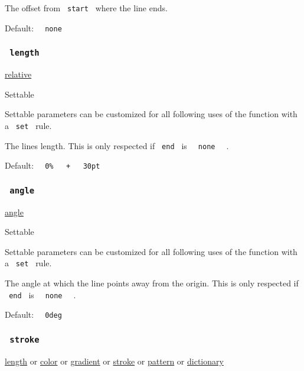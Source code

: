 The offset from \texttt{\ start\ } where the line ends.

Default: \texttt{\ }{\texttt{\ none\ }}\texttt{\ }

\subsubsection{\texorpdfstring{\texttt{\ length\ }}{ length }}\label{parameters-length}

\href{/docs/reference/layout/relative/}{relative}

{{ Settable }}

\label{parameters-length-settable-tooltip}
Settable parameters can be customized for all following uses of the
function with a \texttt{\ set\ } rule.

The line\textquotesingle s length. This is only respected if
\texttt{\ end\ } is \texttt{\ }{\texttt{\ none\ }}\texttt{\ } .

Default:
\texttt{\ }{\texttt{\ 0\%\ }}\texttt{\ }{\texttt{\ +\ }}\texttt{\ }{\texttt{\ 30pt\ }}\texttt{\ }

\subsubsection{\texorpdfstring{\texttt{\ angle\ }}{ angle }}\label{parameters-angle}

\href{/docs/reference/layout/angle/}{angle}

{{ Settable }}

\label{parameters-angle-settable-tooltip}
Settable parameters can be customized for all following uses of the
function with a \texttt{\ set\ } rule.

The angle at which the line points away from the origin. This is only
respected if \texttt{\ end\ } is
\texttt{\ }{\texttt{\ none\ }}\texttt{\ } .

Default: \texttt{\ }{\texttt{\ 0deg\ }}\texttt{\ }

\subsubsection{\texorpdfstring{\texttt{\ stroke\ }}{ stroke }}\label{parameters-stroke}

\href{/docs/reference/layout/length/}{length} {or}
\href{/docs/reference/visualize/color/}{color} {or}
\href{/docs/reference/visualize/gradient/}{gradient} {or}
\href{/docs/reference/visualize/stroke/}{stroke} {or}
\href{/docs/reference/visualize/pattern/}{pattern} {or}
\href{/docs/reference/foundations/dictionary/}{dictionary}

